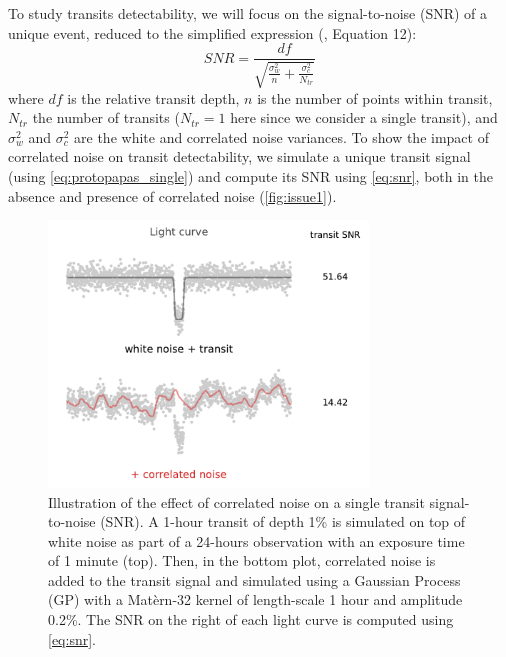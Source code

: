 \documentclass{aastex631}
\begin{document}
To study transits detectability, we will focus on the signal-to-noise (SNR) of a unique event, reduced to the simplified expression (\citealt{pont2006}, Equation 12):
\begin{equation}\label{eq:snr}
  SNR= \frac{df}{\sqrt{\frac{\sigma_w^2}{n} + \frac{\sigma_c^2}{N_{tr}}}}
\end{equation}
where $df$ is the relative transit depth, $n$ is the number of points within transit, $N_{tr}$ the number of transits ($N_{tr}=1$ here since we consider a single transit), and $\sigma_w^2$ and $\sigma_c^2$ are the white and correlated noise variances. To show the impact of correlated noise on transit detectability, we simulate a unique transit signal (using \autoref{eq:protopapas_single}) and compute its SNR using \autoref{eq:snr}, both in the absence and presence of correlated noise (\autoref{fig:issue1}).

\begin{figure}[H]
    \begin{centering}
        \includegraphics[width=8.5cm]{../figures/issue1.pdf}
        \caption{Illustration of the effect of correlated noise on a single transit signal-to-noise (SNR). A 1-hour transit of depth 1\% is simulated on top of white noise as part of a 24-hours observation with an exposure time of 1 minute (top). Then, in the bottom plot, correlated noise is added to the transit signal and simulated using a Gaussian Process (GP) with a Matèrn-32 kernel of length-scale 1 hour and amplitude 0.2\%. The SNR on the right of each light curve is computed using \autoref{eq:snr}.}
        \label{fig:issue1}
    \end{centering}
\end{figure}
\end{document}
